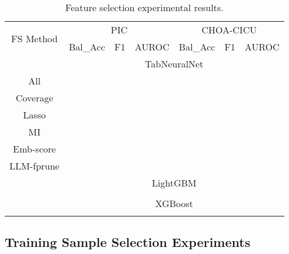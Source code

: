 \begin{appendices}
\begin{table}[ht!]
\centering
\caption{Feature selection experimental results.}
\label{tab:feat_sele}
\begin{tabular}{c|ccc|ccc}
\toprule
\multirow{2}{*}{FS Method} & \multicolumn{3}{c|}{PIC} & \multicolumn{3}{|c}{CHOA-CICU}\\ 
& Bal\_Acc & F1 & AUROC & Bal\_Acc & F1 & AUROC\\
\midrule
& \multicolumn{6}{c}{TabNeuralNet}\\
All & \\
Coverage &  \\
Lasso & \\
MI & \\
Emb-score & \\
LLM-fprune & \\
\hline
& \multicolumn{6}{c}{LightGBM}\\
&  \\
\hline
& \multicolumn{6}{c}{XGBoost}\\
&  \\
\bottomrule
\end{tabular}
\end{table}

\subsection{Training Sample Selection Experiments}

\end{appendices}